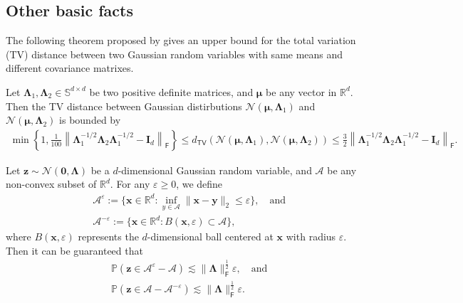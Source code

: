 \subsection{Other basic facts}
The following theorem proposed by \cite{devroye2018total} gives an upper bound for the total variation (TV) distance between two Gaussian random variables with same means and different covariance matrixes.
\begin{customtheorem}\label{thm:DMR}
 Let $\bm{\Lambda}_1, \bm{\Lambda}_2 \in \mathbb{S}^{d \times d}$ be two positive definite matrices, and $\bm{\mu}$ be any vector in $\mathbb{R}^d$. Then the TV distance between Gaussian distirbutions $\mathcal{N}(\bm{\mu},\bm{\Lambda}_1)$ and $\mathcal{N}(\bm{\mu},\bm{\Lambda}_2)$ is bounded by
\begin{align*}
\min\left\{1,\frac{1}{100}\left\|\bm{\Lambda}_1^{-1/2}\bm{\Lambda}_2 \bm{\Lambda}_1^{-1/2}-\bm{I}_d\right\|_{\mathsf{F}} \right\} 
 \leq d_{\mathsf{TV}}(\mathcal{N}(\bm{\mu},\bm{\Lambda}_1),\mathcal{N}(\bm{\mu},\bm{\Lambda}_2)) 
\leq \frac{3}{2}\left\|\bm{\Lambda}_1^{-1/2}\bm{\Lambda}_2 \bm{\Lambda}_1^{-1/2}-\bm{I}_d\right\|_{\mathsf{F}}. 
\end{align*}
\end{customtheorem}

\begin{customtheorem}\label{thm:Gaussian-reminder}
Let $\bm{z} \sim \mathcal{N}(\bm{0},\bm{\Lambda})$ be a $d$-dimensional Gaussian random variable, and $\mathcal{A}$ be any non-convex subset of $\mathbb{R}^d$. For any $\varepsilon \geq 0$, we define
\begin{align}\label{eq:defn-A-eps}
&\mathcal{A}^{\varepsilon} := \{\bm{x} \in \mathbb{R}^d: \inf_{y \in \mathcal{A}} \|\bm{x} - \bm{y}\|_2 \leq \varepsilon\}, \quad \text{and} \nonumber \\ 
&\mathcal{A}^{-\varepsilon}:=\{\bm{x} \in \mathbb{R}^d: B(\bm{x},\varepsilon) \subset \mathcal{A}\},
\end{align}
where $B(\bm{x},\varepsilon)$ represents the $d$-dimensional ball centered at $\bm{x}$ with radius $\varepsilon$. Then it can be guaranteed that
\begin{align*}
&\mathbb{P}(\bm{z} \in \mathcal{A}^{\varepsilon} - \mathcal{A}) \lesssim \|\bm{\Lambda}\|_{\mathsf{F}}^{\frac{1}{2}}\varepsilon, \quad \text{and} \\ 
&\mathbb{P}(\bm{z} \in \mathcal{A} - \mathcal{A}^{-\varepsilon})\lesssim \|\bm{\Lambda}\|_{\mathsf{F}}^{\frac{1}{2}}\varepsilon.
\end{align*}
\end{customtheorem}


